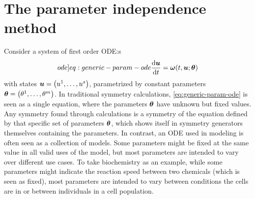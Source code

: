 \section{The parameter independence method}

Consider a system of first order ODE:s
\begin{equation} \label[ode]{eq:generic-param-ode}
  \diff{\vect{u}}{t} = \vect{\omega}(t, \vect{u}; \vect{\theta})
\end{equation}
with states \(\vect{u} = \left(u^1, \dots, u^s\right)\), parametrized by constant parameters \(\vect{\theta} = \left(\theta^1, \dots, \theta^m\right)\).
In traditional symmetry calculations, \cref{eq:generic-param-ode} is seen as a single equation, where the parameters \(\boldsymbol{\theta}\) have unknown but fixed values.
Any symmetry found through calculations is a symmetry of the equation defined by that specific set of parameters \(\boldsymbol{\theta}\), which shows itself in symmetry generators themselves containing the parameters.
In contrast, an ODE used in modeling is often seen as a collection of models.
Some parameters might be fixed at the same value in all valid uses of the model, but most parameters are intended to vary over different use cases.
To take biochemistry as an example, while some parameters might indicate the reaction speed between two chemicals (which is seen as fixed), most parameters are intended to vary between conditions the cells are in or between individuals in a cell population.

